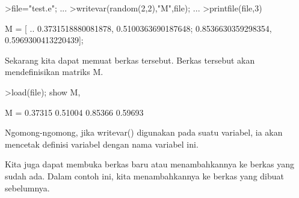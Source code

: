 \documentclass[a4paper,10pt]{article}
\begin{document}
\begin{eulernotebook}
\begin{eulercomment}
\begin{eulercomment}
\begin{eulercomment}
\begin{eulercomment}
\begin{eulercomment}
\begin{eulercomment}
\begin{eulercomment}
\begin{eulercomment}
\begin{eulercomment}
\begin{eulercomment}
\begin{eulercomment}
\begin{eulercomment}
\begin{eulercomment}
\begin{eulercomment}
\begin{eulercomment}
\begin{eulercomment}
\begin{eulercomment}
\begin{eulercomment}
\begin{eulercomment}
\begin{eulercomment}
\begin{eulercomment}
\begin{eulercomment}
\begin{eulercomment}
\begin{eulercomment}
\begin{eulercomment}
\begin{eulercomment}
\begin{eulercomment}
\begin{eulercomment}
\begin{eulercomment}
\begin{eulercomment}
\begin{eulercomment}
\begin{eulercomment}
\begin{eulercomment}
\begin{eulercomment}
\begin{eulercomment}
\begin{eulercomment}
\begin{eulerprompt}
>file="test.e"; ...
>writevar(random(2,2),"M",file); ...
>printfile(file,3)
\end{eulerprompt}
\begin{euleroutput}
  M = [ ..
  0.3731518880081878, 0.5100363690187648;
  0.8536630359298354, 0.5969300413220439];
\end{euleroutput}
\begin{eulercomment}
Sekarang kita dapat memuat berkas tersebut. Berkas tersebut akan
mendefinisikan matriks M.
\end{eulercomment}
\begin{eulerprompt}
>load(file); show M,
\end{eulerprompt}
\begin{euleroutput}
  M = 
    0.37315   0.51004 
    0.85366   0.59693 
\end{euleroutput}
\begin{eulercomment}
Ngomong-ngomong, jika writevar() digunakan pada suatu variabel, ia
akan mencetak definisi variabel dengan nama variabel ini.
\end{eulercomment}
\begin{eulercomment}
Kita juga dapat membuka berkas baru atau menambahkannya ke berkas yang
sudah ada. Dalam contoh ini, kita menambahkannya ke berkas yang dibuat
sebelumnya.
\end{eulercomment}
\begin{eulerprompt}

\end{eulerprompt}
\end{eulercomment}
\end{eulercomment}
\end{eulercomment}
\end{eulercomment}
\end{eulercomment}
\end{eulercomment}
\end{eulercomment}
\end{eulercomment}
\end{eulercomment}
\end{eulercomment}
\end{eulercomment}
\end{eulercomment}
\end{eulercomment}
\end{eulercomment}
\end{eulercomment}
\end{eulercomment}
\end{eulercomment}
\end{eulercomment}
\end{eulercomment}
\end{eulercomment}
\end{eulercomment}
\end{eulercomment}
\end{eulercomment}
\end{eulercomment}
\end{eulercomment}
\end{eulercomment}
\end{eulercomment}
\end{eulercomment}
\end{eulercomment}
\end{eulercomment}
\end{eulercomment}
\end{eulercomment}
\end{eulercomment}
\end{eulercomment}
\end{eulercomment}
\end{eulercomment}
\end{eulernotebook}
\end{document}
